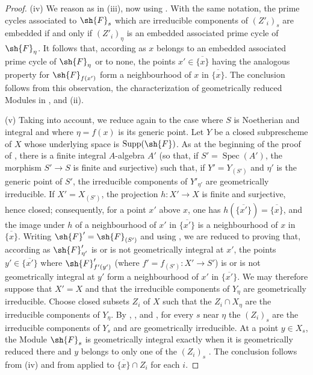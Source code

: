 \begin{proof}
(iv) We reason as in (iii), now using .
With the same notation, the prime cycles associated to $\sh{F}_s$ which are irreducible components of $(Z'_i)_s$ are embedded if and only if $(Z'_i)_\eta$ is an embedded associated prime cycle of $\sh{F}_\eta$.
It follows that, according as $x$ belongs to an embedded associated prime cycle of $\sh{F}_\eta$ or to none, the points $x'\in\overline{\{x\}}$ having the analogous property for $\sh{F}_{f(x')}$ form a neighbourhood of $x$ in $\overline{\{x\}}$.
The conclusion follows from this observation, the characterization of geometrically reduced Modules in , and (ii).

(v) Taking  into account, we reduce again to the case where $S$ is Noetherian and integral and where $\eta=f(x)$ is its generic point.
Let $Y$ be a closed subprescheme of $X$ whose underlying space is $\operatorname{Supp}(\sh{F})$.
As at the beginning of the proof of , there is a finite integral $A$-algebra $A'$ (so that, if $S'=\operatorname{Spec}(A')$, the morphism $S'\to S$ is finite and surjective) such that, if $Y'=Y_{(S')}$ and $\eta'$ is the generic point of $S'$, the irreducible components of $Y'_{\eta'}$ are geometrically irreducible.
If $X'=X_{(S')}$, the projection $h:X'\to X$ is finite and surjective, hence closed; consequently, for a point $x'$ above $x$, one has $h(\overline{\{x'\}})=\overline{\{x\}}$, and the image under $h$ of a neighbourhood of $x'$ in $\overline{\{x'\}}$ is a neighbourhood of $x$ in $\overline{\{x\}}$.
Writing $\sh{F}'=\sh{F}_{(S')}$ and using , we are reduced to proving that, according as $\sh{F}'_{\eta'}$ is or is not geometrically integral at $x'$, the points $y'\in\overline{\{x'\}}$ where $\sh{F}'_{f'(y')}$ (where $f'=f_{(S')}:X'\to S'$) is or is not geometrically integral at $y'$ form a neighbourhood of $x'$ in $\overline{\{x'\}}$.
We may therefore suppose that $X'=X$ and that the irreducible components of $Y_\eta$ are geometrically irreducible.
Choose closed subsets $Z_i$ of $X$ such that the $Z_i\cap X_\eta$ are the
  irreducible components of $Y_\eta$.
By , , and , for every $s$ near $\eta$ the $(Z_i)_s$ are the irreducible components of $Y_s$ and are geometrically irreducible.
At a point $y\in X_s$, the Module $\sh{F}_s$ is geometrically integral exactly when it is geometrically reduced there and $y$ belongs to only one of the $(Z_i)_s$ .
The conclusion follows from (iv) and from  applied to $\overline{\{x\}}\cap Z_i$ for each $i$.


\end{proof}

